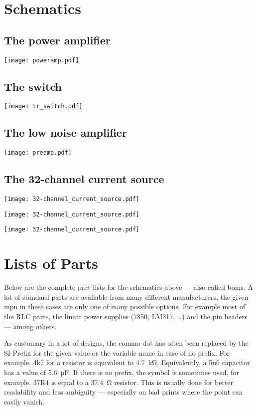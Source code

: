 \chapter{Schematics}
\section{The power amplifier}
\texttt{[image: poweramp.pdf]}

\section{The switch}
\texttt{[image: tr\_switch.pdf]}

\section{The low noise amplifier}
\texttt{[image: preamp.pdf]}

\section{The 32-channel current source}
\texttt{[image: 32-channel\_current\_source.pdf]}

\texttt{[image: 32-channel\_current\_source.pdf]}

\texttt{[image: 32-channel\_current\_source.pdf]}

\chapter{Lists of Parts}
Below are the complete part lists for the schematics above --- also called \acrshort{bom}s. A lot of standard parts are available from many different manufacturers, the given \acrfull{mpn} in these cases are only one of many possible options. For example most of the RLC parts, the linear power supplies (7850, LM317, \ldots) and the pin headers --- among others.

As customary in a lot of designs, the comma dot has often been replaced by the SI-Prefix for the given value or the variable name in case of no prefix. For example, 4k7 for a resistor is equivalent to \qty{4.7}{\kilo\ohm}. Equivalently, a 5u6 capacitor has a value of \qty{5.6}{\micro\farad}. If there is no prefix, the symbol is sometimes used, for example, 37R4 is equal to a \qty{37.4}{\ohm} resistor. This is usually done for better readability and less ambiguity --- especially on bad prints where the point can easily vanish.

